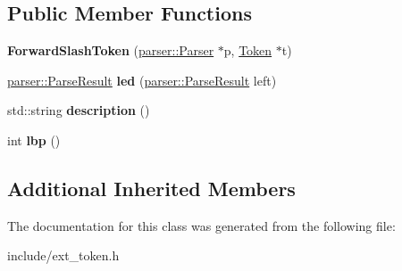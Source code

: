\subsection*{Public Member Functions}
\begin{DoxyCompactItemize}
\item 
{\bfseries Forward\+Slash\+Token} (\hyperlink{classfcal_1_1parser_1_1Parser}{parser\+::\+Parser} $\ast$p, \hyperlink{classfcal_1_1scanner_1_1Token}{Token} $\ast$t)\hypertarget{classfcal_1_1scanner_1_1ForwardSlashToken_a78339cc748c46b86c73945ea345e6e1d}{}\label{classfcal_1_1scanner_1_1ForwardSlashToken_a78339cc748c46b86c73945ea345e6e1d}

\item 
\hyperlink{classfcal_1_1parser_1_1ParseResult}{parser\+::\+Parse\+Result} {\bfseries led} (\hyperlink{classfcal_1_1parser_1_1ParseResult}{parser\+::\+Parse\+Result} left)\hypertarget{classfcal_1_1scanner_1_1ForwardSlashToken_a75ba06718e3faa1d53c62182d0f7b1db}{}\label{classfcal_1_1scanner_1_1ForwardSlashToken_a75ba06718e3faa1d53c62182d0f7b1db}

\item 
std\+::string {\bfseries description} ()\hypertarget{classfcal_1_1scanner_1_1ForwardSlashToken_a04d39d9ea4cbb704862d33cb447de83b}{}\label{classfcal_1_1scanner_1_1ForwardSlashToken_a04d39d9ea4cbb704862d33cb447de83b}

\item 
int {\bfseries lbp} ()\hypertarget{classfcal_1_1scanner_1_1ForwardSlashToken_ae2c4a56a7c81f1f9d697ccca1e95c153}{}\label{classfcal_1_1scanner_1_1ForwardSlashToken_ae2c4a56a7c81f1f9d697ccca1e95c153}

\end{DoxyCompactItemize}
\subsection*{Additional Inherited Members}


The documentation for this class was generated from the following file\+:\begin{DoxyCompactItemize}
\item 
include/ext\+\_\+token.\+h\end{DoxyCompactItemize}
